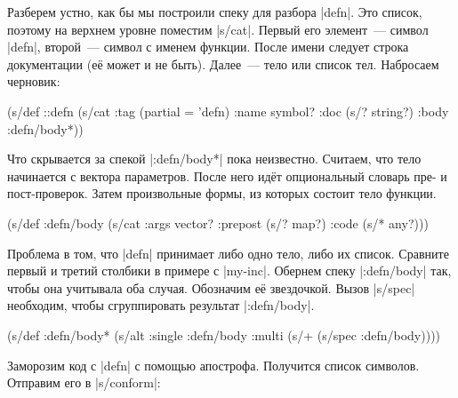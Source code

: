 
Разберем устно, как бы мы построили спеку для разбора \spverb|defn|. Это список,
поэтому на верхнем уровне поместим \spverb|s/cat|. Первый его элемент~--- символ
\spverb|defn|, второй~--- символ с именем функции. После имени следует строка
документации (е\"{е} может и не быть). Далее~--- тело или список тел. Набросаем
черновик:

\begin{english}
  \begin{clojure}
(s/def ::defn
  (s/cat :tag (partial = 'defn)
         :name symbol?
         :doc (s/? string?)
         :body :defn/body*))
  \end{clojure}
\end{english}

Что скрывается за спекой \spverb|:defn/body*| пока неизвестно. Считаем, что тело
начинается с вектора параметров. После него ид\"{е}т опциональный словарь пре- и
пост-проверок. Затем произвольные формы, из которых состоит тело функции.

\begin{english}
  \begin{clojure}
(s/def :defn/body
  (s/cat :args vector?
         :prepost (s/? map?)
         :code (s/* any?)))
  \end{clojure}
\end{english}

Проблема в том, что \spverb|defn| принимает либо одно тело, либо их список.
Сравните первый и третий столбики в примере с \spverb|my-inc|. Обернем спеку
\spverb|:defn/body| так, чтобы она учитывала оба случая. Обозначим е\"{е}
звездочкой. Вызов \spverb|s/spec| необходим, чтобы сгруппировать результат
\spverb|:defn/body|.

\begin{english}
  \begin{clojure}
(s/def :defn/body*
  (s/alt :single :defn/body
         :multi (s/+ (s/spec :defn/body))))
  \end{clojure}
\end{english}


Заморозим код с \spverb|defn| с помощью апострофа. Получится список
символов. Отправим его в \spverb|s/conform|:

\begin{english}
\end{english}

